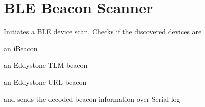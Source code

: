 \chapter{BLE Beacon Scanner}
\hypertarget{md__c_1_2_users_2hatta_2_desktop_2presonal-projects_2security-camera_2esp-idf-vs-ext_2_e_s_p-32-e695fc40fe299cbb5f4b7767db6fc770}{}\label{md__c_1_2_users_2hatta_2_desktop_2presonal-projects_2security-camera_2esp-idf-vs-ext_2_e_s_p-32-e695fc40fe299cbb5f4b7767db6fc770}
\label{md__c_1_2_users_2hatta_2_desktop_2presonal-projects_2security-camera_2esp-idf-vs-ext_2_e_s_p-32-e695fc40fe299cbb5f4b7767db6fc770_autotoc_md16}%
%


Initiates a BLE device scan. Checks if the discovered devices are
\begin{DoxyItemize}
\item an i\+Beacon
\item an Eddystone TLM beacon
\item an Eddystone URL beacon
\end{DoxyItemize}

and sends the decoded beacon information over Serial log 